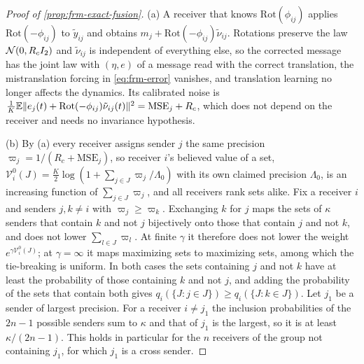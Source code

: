 \begin{proof}[Proof of \cref{prop:frm-exact-fusion}]
(a) A receiver that knows $\mathrm{Rot}(\phi_{ij})$ applies $\mathrm{Rot}(-\phi_{ij})$ to $\tilde y_{ij}$ and obtains $m_j+\mathrm{Rot}(-\phi_{ij})\tilde\nu_{ij}$. Rotations preserve the law $\mathcal{N}(0,R_cI_2)$ and $\tilde\nu_{ij}$ is independent of everything else, so the corrected message has the joint law with $(\eta,e)$ of a message read with the correct translation, the mistranslation forcing in \eqref{eq:frm-error} vanishes, and translation learning no longer affects the dynamics. Its calibrated noise is $\frac1K\mathbb{E}\Vert e_j(t)+\mathrm{Rot}(-\phi_{ij})\tilde\nu_{ij}(t)\Vert^2=\mathrm{MSE}_j+R_c$, which does not depend on the receiver and needs no invariance hypothesis.

(b) By (a) every receiver assigns sender $j$ the same precision $\varpi_j=1/(R_c+\mathrm{MSE}_j)$, so receiver $i$'s believed value of a set, $\mathcal V^0_i(J)=\frac K2\log(1+\sum_{j\in J}\varpi_j/\Lambda_0)$ with its own claimed precision $\Lambda_0$, is an increasing function of $\sum_{j\in J}\varpi_j$, and all receivers rank sets alike. Fix a receiver $i$ and senders $j,k\ne i$ with $\varpi_j\ge\varpi_k$. Exchanging $k$ for $j$ maps the sets of $\kappa$ senders that contain $k$ and not $j$ bijectively onto those that contain $j$ and not $k$, and does not lower $\sum_{l\in J}\varpi_l$. At finite $\gamma$ it therefore does not lower the weight $e^{\gamma\mathcal V^0_i(J)}$; at $\gamma=\infty$ it maps maximizing sets to maximizing sets, among which the tie-breaking is uniform. In both cases the sets containing $j$ and not $k$ have at least the probability of those containing $k$ and not $j$, and adding the probability of the sets that contain both gives $q_i(\{J:j\in J\})\ge q_i(\{J:k\in J\})$. Let $j_1$ be a sender of largest precision. For a receiver $i\ne j_1$ the inclusion probabilities of the $2n-1$ possible senders sum to $\kappa$ and that of $j_1$ is the largest, so it is at least $\kappa/(2n-1)$. This holds in particular for the $n$ receivers of the group not containing $j_1$, for which $j_1$ is a cross sender.


\end{proof}
